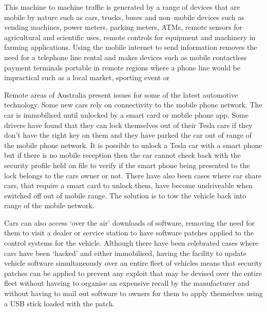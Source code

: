 This machine to machine traffic is generated by a range of devices that are mobile by nature such as cars, trucks, buses and non--mobile devices such as vending machines, power meters, parking meters, ATMs, remote sensors for agricultural and scientific uses, remote controls for equipment and machinery in farming applications. Using the mobile internet to send information removes the need for a telephone line rental and makes devices such as mobile contactless payment terminals portable in remote regions where a phone line would be impractical such as a local market, sporting event or 

Remote areas of Australia present issues for some of the latest automotive technology. Some new cars rely on connectivity to the mobile phone network. The car is immobilised until unlocked by a smart card or mobile phone app. Some drivers have found that they can lock themselves out of their Tesla cars if they don't have the right key on them and they have parked the car out of range of the mobile phone network. It is possible to unlock a Tesla car with a smart phone but if there is no mobile reception then the car cannot check back with the security profile held on file to verify if the smart phone being presented to the lock belongs to the cars owner or not. There have also been cases where car share cars, that require a smart card to unlock them, have become undriveable when switched off out of mobile range. The solution is to tow the vehicle back into range of the mobile network. 

Cars can also access `over the air' downloads of software, removing the need for them to visit a dealer or service station to have software patches applied to the control systems for the vehicle. Although there have been celebrated cases where cars have been `hacked' and either immobilised, having the facility to update vehicle software simultaneously over an entire fleet of vehicles means that security patches can be applied to prevent any exploit that may be devised over the entire fleet without haveing to organise an expensive recall by the manufacturer and without having to mail out software to owners for them to apply themselves using a USB stick loaded with the patch\cite{RefWorks:351}. 

